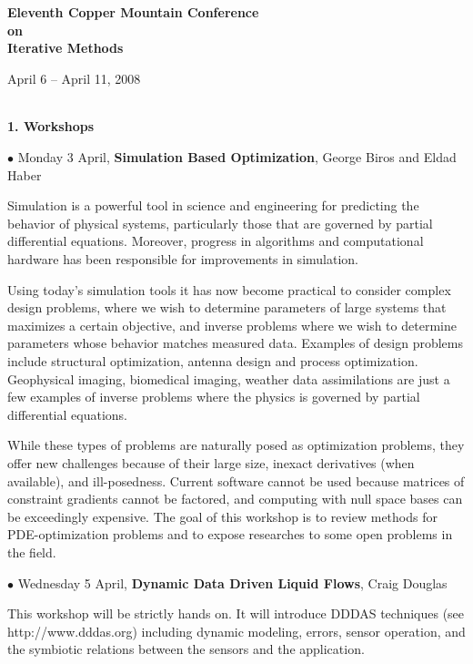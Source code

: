 \documentclass[twosided]{report}
\begin{document}
\begin{center}
	{\Large \bf
	Eleventh Copper Mountain Conference \\
	{\large on} \\
	Iterative Methods \par
	April 6 -- April 11, 2008
	}
\end{center}

	${}^{}$\par	%
	\begin{center} {\LARGE {\bf 1. Workshops}} \end{center}

	$\bullet$
	Monday 3 April,
	{\bf Simulation Based Optimization},
	George Biros and Eldad Haber

Simulation is a powerful tool in science and engineering for
predicting the behavior of physical systems, particularly
those that are governed by partial differential equations.
Moreover, progress in algorithms and computational hardware
has been responsible for improvements in simulation.

Using today's simulation tools it has now become practical
to consider complex design problems, where we wish to
determine parameters of large systems that maximizes a
certain objective, and inverse problems where we wish to
determine parameters whose behavior matches measured data.
Examples of design problems include structural optimization,
antenna design and process optimization. Geophysical
imaging, biomedical imaging, weather data assimilations are
just a few examples of inverse problems where the physics is
governed by partial differential equations.

While these types of problems are naturally posed as
optimization problems, they offer new challenges because of
their large size, inexact derivatives (when available), and
ill-posedness. Current software cannot be used because
matrices of constraint gradients cannot be factored, and
computing with null space bases can be exceedingly
expensive. The goal of this workshop is to review methods
for PDE-optimization problems and to expose researches to
some open problems in the field.

	$\bullet$
	Wednesday 5 April,
	{\bf Dynamic Data Driven Liquid Flows},
	Craig Douglas

This workshop will be strictly hands on. It will introduce
DDDAS techniques (see http://www.dddas.org) including
dynamic modeling, errors, sensor operation, and the
symbiotic relations between the sensors and the application.
\end{document}
